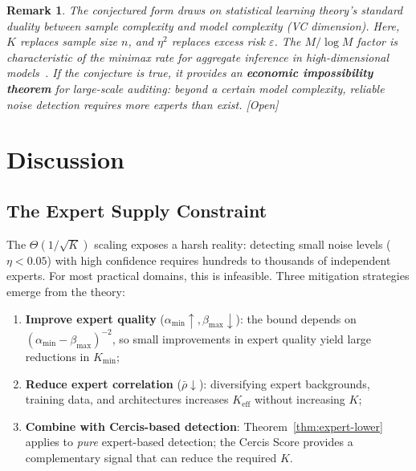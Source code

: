 \documentclass[12pt,a4paper]{article}
\newtheorem{remark}[theorem]{Remark}
\newcommand{\openquest}{\textcolor{red!70!black}{\small\textsf{[Open]}}}
\newcommand{\rhobar}{\bar{\rho}}
\begin{document}
\begin{remark}
The conjectured form draws on statistical learning theory's standard duality
between sample complexity and model complexity (VC dimension).  Here, $K$
replaces sample size $n$, and $\eta^{2}$ replaces excess risk $\varepsilon$.
The $M/\log M$ factor is characteristic of the minimax rate for aggregate
inference in high-dimensional models~\citep{wainwright2019high}.  If the
conjecture is true, it provides an \textbf{economic impossibility theorem}
for large-scale auditing: beyond a certain model complexity, reliable noise
detection requires more experts than exist.  \openquest
\end{remark}

\section{Discussion}

\subsection{The Expert Supply Constraint}

The $\Theta(1/\sqrt{K})$ scaling exposes a harsh reality: detecting small
noise levels ($\eta<0.05$) with high confidence requires hundreds to thousands
of independent experts.  For most practical domains, this is infeasible.
Three mitigation strategies emerge from the theory:

\begin{enumerate}[label=(\roman*)]
    \item \textbf{Improve expert quality} ($\alpha_{\min}\uparrow,\beta_{\max}\downarrow$):
          the bound depends on $(\alpha_{\min}-\beta_{\max})^{-2}$, so small
          improvements in expert quality yield large reductions in $K_{\min}$;
    \item \textbf{Reduce expert correlation} ($\rhobar\downarrow$):
          diversifying expert backgrounds, training data, and architectures
          increases $K_{\mathrm{eff}}$ without increasing $K$;
    \item \textbf{Combine with Cercis-based detection}: Theorem~\ref{thm:expert-lower}
          applies to \emph{pure} expert-based detection; the Cercis Score provides
          a complementary signal that can reduce the required $K$.
\end{enumerate}
\end{document}

